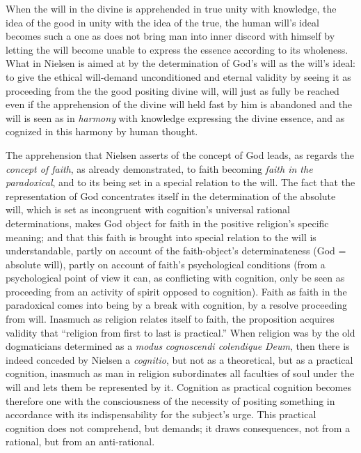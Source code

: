 \documentclass[12pt,a4paper]{book}
\begin{document}
When the will in the divine is apprehended in true unity with knowledge, the idea of the good in unity with the
idea of the true, the human will's ideal becomes such a one as does not bring man into inner discord with
himself by letting the will become unable to express the essence according to its wholeness. What in Nielsen is
aimed at by the determination of God's will as the will's ideal: to give the ethical will-demand unconditioned
and eternal validity by seeing it as proceeding from the the good positing divine will, will just as fully be
reached even if the apprehension of the divine will held fast by him is abandoned and the will is seen as in
\emph{harmony} with knowledge expressing the divine essence, and as cognized in this harmony by human thought.

The apprehension that Nielsen asserts of the concept of God leads, as regards the \emph{concept of faith}, as already
demonstrated, to faith becoming \emph{faith in the paradoxical}, and to its being set in a special relation to
the will. The fact that the representation of God concentrates itself in the determination of the absolute will,
which is set as incongruent with cognition's universal rational determinations, makes God object for faith in
the positive religion's specific meaning; and that this faith is brought into special relation to the will is
understandable, partly on account of the faith-object's determinateness (God = absolute will), partly on account
of faith's psychological conditions (from a psychological point of view it can, as conflicting with cognition,
only be seen as proceeding from an activity of spirit opposed to cognition). Faith as faith in the paradoxical
comes into being by a break with cognition, by a resolve proceeding from will. Inasmuch as religion relates
itself to faith, the proposition acquires validity that ``religion from first to last is practical.'' When
religion was by the old dogmaticians determined as a \textit{modus} \emph{\textit{cognoscendi colendique}} \textit{Deum}, then there is
indeed conceded by Nielsen a \textit{cognitio}, but not as a theoretical, but as a practical cognition, inasmuch
as man in religion subordinates all faculties of soul under the will and lets them be represented by it.
Cognition as practical cognition becomes therefore one with the consciousness of the necessity of positing
something in accordance with its indispensability for the subject's urge. This practical cognition does not
comprehend, but demands; it draws consequences, not from a rational, but from an anti-rational.
\end{document}
